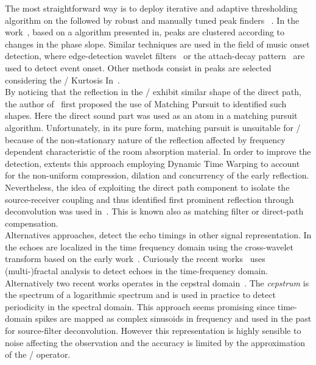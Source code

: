 The most straightforward way is to deploy iterative and adaptive thresholding algorithm on the followed by robust and manually tuned peak finders ~.
In the work~, based on a algorithm presented in, peaks are clustered according to changes in the phase slope.
Similar techniques are used in the field of music onset detection, where edge-detection wavelet filters~ or the attach-decay pattern~ are used to detect event onset.
Other methods consist in peaks are selected considering the \RIR/ Kurtosis In~.
\\By noticing that the reflection in the \RIRs/ exhibit similar shape of the direct path, the author of~ first proposed the use of Matching Pursuit to identified such shapes.
Here the direct sound part was used as an atom in a matching pursuit algorithm.
Unfortunately, in its pure form, matching pursuit is unsuitable for \RIRs/ because of the non-stationary nature of the reflection affected by frequency dependent characteristic of the room absorption material.
In order to improve the detection,  extents this approach employing Dynamic Time Warping to account for the non-uniform compression, dilation and concurrency of the early reflection.
Nevertheless, the idea of exploiting the direct path component to isolate the source-receiver coupling and thus identified first prominent reflection through deconvolution was used in~.
This is known also as matching filter or direct-path compensation.
\\Alternatives approaches, detect the echo timings in other signal representation.
In   the echoes are localized in the time frequency domain using the cross-wavelet transform based on the early work~.
Curiously the recent works~ uses (multi-)fractal analysis to detect echoes in the time-frequency domain.
Alternatively two recent works operates in the cepstral domain~.
The \textit{cepstrum} is the spectrum of a logarithmic spectrum and is used in practice to detect periodicity in the spectral domain.
This approach seems promising since time-domain spikes are mapped as complex sinusoids in frequency and used in the past for source-filter deconvolution.
However this representation is highly sensible to noise affecting the observation and the accuracy is limited by the approximation of the \DFT/ operator.

